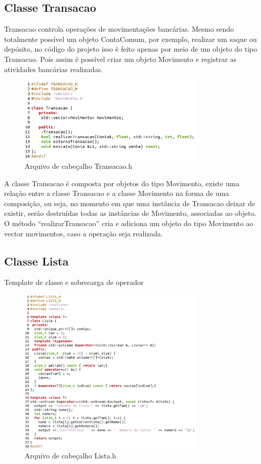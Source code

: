 \documentclass[conference]{IEEEtran}
\begin{document}
    \subsection{Classe Transacao}
    Transacao controla operações de movimentações bancárias. Mesmo sendo totalmente possível um objeto ContaComum, por exemplo, realizar um saque ou depósito, no código do projeto isso é feito apenas por meio de um objeto do tipo Transacao. Pois assim é possível criar um objeto Movimento e registrar as atividades bancárias realizadas.
    \begin{figure}[htbp]
        \centering
        \includegraphics[width=8.8cm]{../img/Transacao.png}
        \caption{Arquivo de cabeçalho Transacao.h}
        \label{fig_Transacao}
    \end{figure}

    A classe Transacao é composta por objetos do tipo Movimento, existe uma relação entre a classe Transacao e a classe Movimento na forma de uma composição, ou seja, no momento em que uma instância de Transacao deixar de existir, serão destruídas todas as instâncias de Movimento, associadas ao objeto. 
O método “realizarTransacao” cria e adiciona um objeto do tipo Movimento ao vector movimentos, caso a operação seja realizada.

\subsection{Classe Lista}

Template de classe e sobrecarga de operador

\begin{figure}[htbp]
    \centering
    \includegraphics[width=8.8cm]{../img/Lista.png}
    \caption{Arquivo de cabeçalho Lista.h}
    \label{fig_Lista}
\end{figure}
\end{document}
